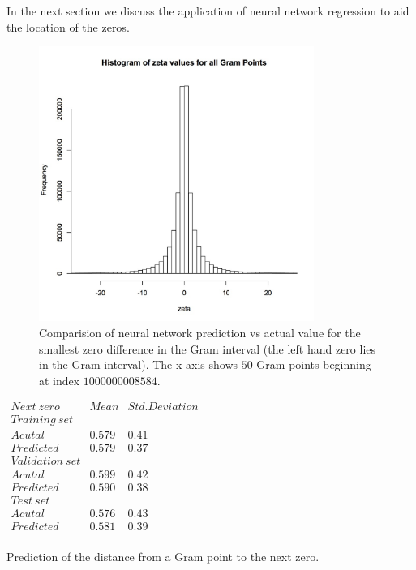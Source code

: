 \documentclass[12pt]{article}
\begin{document}
In the next section we discuss the application of neural network regression to aid
the location of the zeros. 

\begin{figure}
\centering
\includegraphics[width=0.8\textwidth]{rzeta.jpg}
\caption[]{ 
 Comparision of neural network prediction vs actual value
 for the smallest zero difference in the Gram interval
 (the left hand zero lies in the Gram interval).
 The x axis shows $50$ Gram points beginning at index $1000000008584$.
 }
\label{ZeroDifferences}
\end{figure}


\begin{table}
\centering \(\begin{array}{c|c|c}
 Next~zero & Mean & Std. Deviation \\
\hline
Training~set \\
\hline
Acutal       & 0.579 & 0.41 \\
Predicted     & 0.579 & 0.37 \\
\hline
Validation~set \\
\hline
Acutal       & 0.599 & 0.42 \\
Predicted     & 0.590 & 0.38 \\
\hline
Test~set \\
\hline
Acutal       & 0.576& 0.43 \\
Predicted     & 0.581 & 0.39 \\

\end{array}\)
\caption{Prediction of the distance from a 
Gram point to the next zero.} \label{tab:nextZero}
\end{table}
\end{document}
